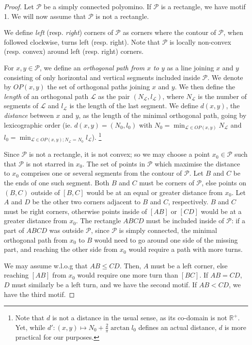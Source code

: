 \documentclass{article}
\newcommand{\R}{\mathbb{R}}
\renewcommand{\L}{\mathcal L}
\renewcommand{\P}{\mathcal P}
\begin{document}
\begin{proof}
Let $\P$ be a simply connected polyomino. If $\P$ is a rectangle, we have motif 1. We will now assume that $\P$ is not a rectangle.

We define \emph{left} (resp. \emph{right}) corners of $\P$ as corners where the contour of $\P$, when followed clockwise, turns left (resp. right). Note that $\P$ is locally non-convex (resp. convex) around left (resp. right) corners.


For $x,y\in \P$, we define an \emph{orthogonal path from $x$ to $y$} as a line joining $x$ and $y$ consisting of only horizontal and vertical segments included inside $\P$. We denote by $OP(x,y)$ the set of orthogonal paths joining $x$ and $y$. 
We then define the \emph{length} of {an orthogonal path $\L$} as the pair $(N_\L,l_\L)$, where $N_{\L}$ is the number of segments of $\L$ and $l_{\L}$ is the length of the last segment. We define $d(x,y)$, the \emph{distance} between $x$ and $y$, as the length of the minimal orthogonal path, going by lexicographic order (ie. $d(x,y)= (N_0,l_0)$ with $N_0=\min_{\L\in OP(x,y)}N_{\L}$ and $l_0=\min_{\L\in OP(x,y); N_\L=N_0}l_{\L}$). \footnote{Note that $d$ is not a distance in the usual sense, as its co-domain is not $\R^+$. Yet, while $d':(x,y)\mapsto N_0+\frac2\pi \arctan l_0$ defines an actual distance, $d$ is more practical for our purposes.}

Since $\P$ is not a rectangle, it is not convex; so we may choose a point $x_0\in \P$ such that $\P$ is not starred in $x_0$. The set of points in $\P$ which maximise the distance to $x_0$ comprises one or several segments from the contour of $\P$. Let $B$ and $C$ be the ends of one such segment. Both $B$ and $C$ must be corners of $\P$, else points on $(B,C)$ outside of $[B,C]$ would be at an equal or greater distance from $x_0$. Let $A$ and $D$ be the other two corners adjacent to $B$ and $C$, respectively. $B$ and $C$ must be right corners, otherwise points inside of $[AB]$ or $[CD]$ would be at a greater distance from $x_0$. 
The rectangle $ABCD$ must be included inside of $\P$: if a part of $ABCD$ was outside $\P$, since $\P$ is simply connected, the minimal orthogonal path from $x_0$ to $B$ would need to go around one side of the missing part, and reaching the other side from $x_0$ would require a path with more turns.

We may assume w.l.o.g that $AB\leq CD$. Then, $A$ must be a left corner, else reaching $[AB]$ from $x_0$ would require one more turn than $[BC]$. If $AB=CD$, $D$ must similarly be a left turn, and we have the second motif. If $AB<CD$, we have the third motif.
\end{proof}
\end{document}
